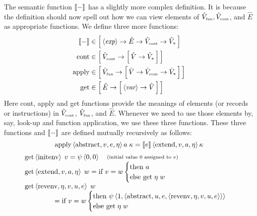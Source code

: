 \begin{enumcirc}
	The semantic function $\left\llbracket - \right\rrbracket$ has a slightly more complex definition.
	It is because the definition should now spell out how we can view elements of
	$\hat{V}_{\textrm{\tiny fun}}, \hat{V}_{\textrm{\tiny cont}}$, and $\hat{E}$ as
	appropriate functions.
	We define three more functions:
	\begin{align*}
		\left\llbracket - \right\rrbracket & \in \left[ \, \left\langle \textit{exp} \right\rangle \to \hat{E} \to \hat{V}_{\textrm{\tiny cont}} \to \hat{V}_* \, \right]                          \\
		\textrm{cont}        & \in \left[ \, \hat{V}_{\textrm{\tiny cont}} \to \left[ \, \hat{V} \to \hat{V}_* \, \right] \, \right]                              \\
		\textrm{apply}       & \in \left[ \, \hat{V}_{\textrm{\tiny fun}} \to \left[ \, \hat{V} \to \hat{V}_{\textrm{\tiny cont}} \to \hat{V}_* \, \right] \, \right] \\
		\textrm{get}         & \in \left[ \, \hat{E} \to \left[ \, \left\langle \textit{var} \right\rangle \to \hat{V} \, \right] \, \right]
	\end{align*}
	Here cont, apply and get functions provide the meanings of elements (or records
	or instructions) in $\hat{V}_{\textrm{\tiny cont}}$, $\hat{V}_{\textrm{\tiny fun}}$,
	and $\hat{E}$.
	Whenever we need to use those elements by, say, look-up and function
	application, we use these three functions.
	These three functions and $\left\llbracket - \right\rrbracket$ are defined mutually recursively as
	follows:
	\[
		\textrm{apply} \left\langle \textrm{abstract}, v, e, \eta \right\rangle a \; \kappa =
		\left\llbracket e \right\rrbracket \left\langle \textrm{extend}, v, a, \eta \right\rangle \kappa
	\]
	\[
		\begin{array}{l}
			\textrm{get} \left\langle \textrm{initenv} \right\rangle \; v                = \psi \left\langle 0, 0 \right\rangle \quad \substack{(\textrm{initial value 0 assigned to } v)} \\
			\textrm{get} \left\langle \textrm{extend}, v, a, \eta \right\rangle \; w     = \textrm{if } v = w
			\begin{cases}
				\textrm{then } a \\
				\textrm{else } \textrm{get} \; \eta \; w
			\end{cases}                                                                                                \\
			\textrm{get} \left\langle \textrm{revenv}, \eta, v, u, e \right\rangle \; w                                                                                    \\
			\;\qquad \qquad = \textrm{if } v = w
			\begin{cases}
				\textrm{then } \psi \left\langle 1, \left\langle \textrm{abstract}, u, e, \left\langle \textrm{revenv}, \eta, v, u, e \right\rangle \right\rangle \right\rangle \\
				\textrm{else } \textrm{get} \; \eta \; w

\end{cases}
\end{array}\]
\end{enumcirc}
